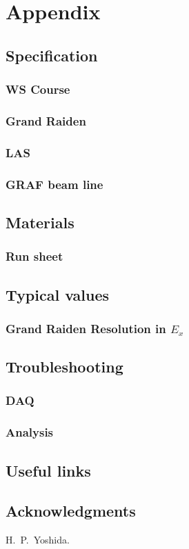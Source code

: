 \part{Appendix}
\chapter{Specification}
\section{WS Course}
\section{Grand Raiden}
\section{LAS}
\section{GRAF beam line}

\chapter{Materials}
\section{Run sheet}
\chapter{Typical values}
\section{Grand Raiden Resolution in $E_x$}

\chapter{Troubleshooting}
\section{DAQ}
\section{Analysis}

\chapter{Useful links}

\chapter*{Acknowledgments}
H.~P.~Yoshida.
